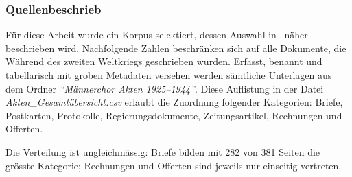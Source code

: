 \documentclass[12pt, a4paper, ngerman, bidi=default]{article}
\begin{document}
\subsubsection{Quellenbeschrieb}\label{Dokumententypen}
\noindent
\begin{minipage}[t]{0.49\textwidth}
  \justifying
  Für diese Arbeit wurde ein Korpus selektiert, dessen Auswahl in~ näher beschrieben wird. Nachfolgende Zahlen beschränken sich auf alle Dokumente, die Während des zweiten Weltkriegs geschrieben wurden.
  Erfasst, benannt und tabellarisch mit groben Metadaten versehen werden sämtliche Unterlagen aus dem Ordner \textit{\enquote{Männerchor Akten 1925--1944}}. 
  Diese Auflistung in der Datei \textit{Akten\_Gesamtübersicht.csv} erlaubt die Zuordnung folgender Kategorien: Briefe, Postkarten, Protokolle, Regierungsdokumente, Zeitungsartikel, Rechnungen und Offerten. 
\end{minipage}%
\hfill
\begin{minipage}[t]{0.49\textwidth}
  \centering
  \vspace*{0.3cm} %
  \label{fig:dokumententypen-bar}
\end{minipage}
\par\vspace{0.06cm}
\noindent
Die Verteilung ist ungleichmässig: Briefe bilden mit 282 von 381 Seiten die grösste Kategorie; Rechnungen und Offerten sind jeweils nur einseitig vertreten.\\
\end{document}
